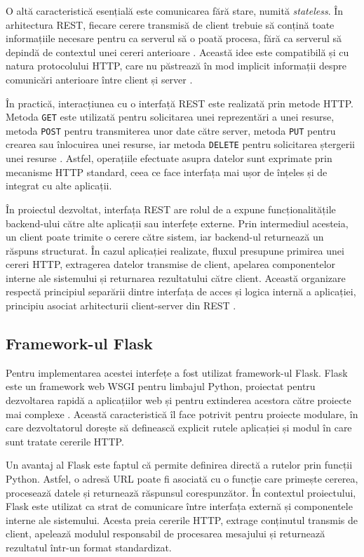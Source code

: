 \documentclass[12pt, a4paper, oneside, romanian]{teza-upb}
\begin{document}
O altă caracteristică esențială este comunicarea fără stare, numită \textit{stateless}. În arhitectura REST, fiecare cerere transmisă de client trebuie să conțină toate informațiile necesare pentru ca serverul să o poată procesa, fără ca serverul să depindă de contextul unei cereri anterioare \cite{fielding_rest}. Această idee este compatibilă și cu natura protocolului HTTP, care nu păstrează în mod implicit informații despre comunicări anterioare între client și server \cite{mdn_http}.

În practică, interacțiunea cu o interfață REST este realizată prin metode HTTP. Metoda \texttt{GET} este utilizată pentru solicitarea unei reprezentări a unei resurse, metoda \texttt{POST} pentru transmiterea unor date către server, metoda \texttt{PUT} pentru crearea sau înlocuirea unei resurse, iar metoda \texttt{DELETE} pentru solicitarea ștergerii unei resurse \cite{mdn_http_methods}. Astfel, operațiile efectuate asupra datelor sunt exprimate prin mecanisme HTTP standard, ceea ce face interfața mai ușor de înțeles și de integrat cu alte aplicații.

În proiectul dezvoltat, interfața REST are rolul de a expune funcționalitățile backend-ului către alte aplicații sau interfețe externe. Prin intermediul acesteia, un client poate trimite o cerere către sistem, iar backend-ul returnează un răspuns structurat. În cazul aplicației realizate, fluxul presupune primirea unei cereri HTTP, extragerea datelor transmise de client, apelarea componentelor interne ale sistemului și returnarea rezultatului către client. Această organizare respectă principiul separării dintre interfața de acces și logica internă a aplicației, principiu asociat arhitecturii client-server din REST \cite{fielding_rest}.


\subsection{Framework-ul Flask}


Pentru implementarea acestei interfețe a fost utilizat framework-ul Flask. Flask este un framework web WSGI pentru limbajul Python, proiectat pentru dezvoltarea rapidă a aplicațiilor web și pentru extinderea acestora către proiecte mai complexe \cite{flask_doc}. Această caracteristică îl face potrivit pentru proiecte modulare, în care dezvoltatorul dorește să definească explicit rutele aplicației și modul în care sunt tratate cererile HTTP.

Un avantaj al Flask este faptul că permite definirea directă a rutelor prin funcții Python. Astfel, o adresă URL poate fi asociată cu o funcție care primește cererea, procesează datele și returnează răspunsul corespunzător. În contextul proiectului, Flask este utilizat ca strat de comunicare între interfața externă și componentele interne ale sistemului. Acesta preia cererile HTTP, extrage conținutul transmis de client, apelează modulul responsabil de procesarea mesajului și returnează rezultatul într-un format standardizat.
\end{document}
